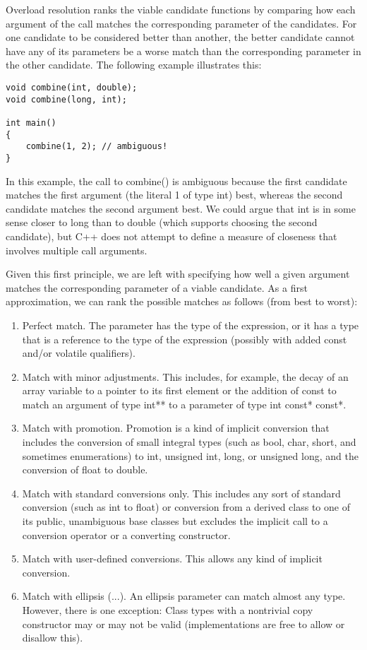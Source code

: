 
Overload resolution ranks the viable candidate functions by comparing how each argument of the call matches the corresponding parameter of the candidates. For one candidate to be considered better than another, the better candidate cannot have any of its parameters be a worse match than the corresponding parameter in the other candidate. The following example illustrates this:

\begin{lstlisting}[style=styleCXX]
void combine(int, double);
void combine(long, int);

int main()
{
	combine(1, 2); // ambiguous!
}
\end{lstlisting}

In this example, the call to combine() is ambiguous because the first candidate matches the first argument (the literal 1 of type int) best, whereas the second candidate matches the second argument best. We could argue that int is in some sense closer to long than to double (which supports choosing the second candidate), but C++ does not attempt to define a measure of closeness that involves multiple call arguments.

Given this first principle, we are left with specifying how well a given argument matches the corresponding parameter of a viable candidate. As a first approximation, we can rank the possible matches as follows (from best to worst):

\begin{enumerate}
\item 
Perfect match. The parameter has the type of the expression, or it has a type that is a reference to the type of the expression (possibly with added const and/or volatile qualifiers).

\item 
Match with minor adjustments. This includes, for example, the decay of an array variable to a pointer to its first element or the addition of const to match an argument of type int** to a parameter of type int const* const*.


\item 
Match with promotion. Promotion is a kind of implicit conversion that includes the conversion of small integral types (such as bool, char, short, and sometimes enumerations) to int, unsigned int, long, or unsigned long, and the conversion of float to double.


\item 
Match with standard conversions only. This includes any sort of standard conversion (such as int to float) or conversion from a derived class to one of its public, unambiguous base classes but excludes the implicit call to a conversion operator or a converting constructor.


\item 
Match with user-defined conversions. This allows any kind of implicit conversion.


\item 
Match with ellipsis (...). An ellipsis parameter can match almost any type. However, there is one exception: Class types with a nontrivial copy constructor may or may not be valid (implementations are free to allow or disallow this).
\end{enumerate}

